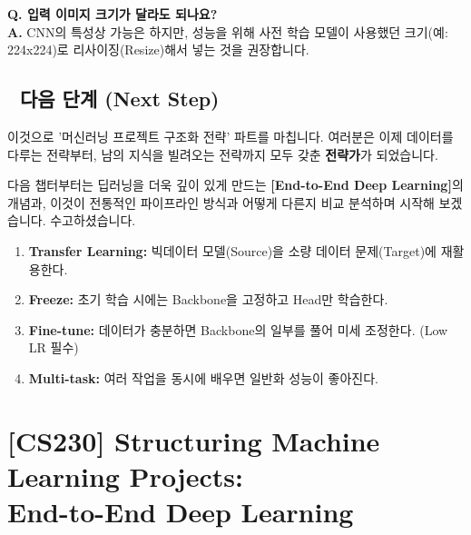 \documentclass[11pt,a4paper]{book}
\theoremstyle{definition}
\begin{document}
\textbf{Q. 입력 이미지 크기가 달라도 되나요?} \\
\textbf{A.} CNN의 특성상 가능은 하지만, 성능을 위해 사전 학습 모델이 사용했던 크기(예: 224x224)로 리사이징(Resize)해서 넣는 것을 권장합니다.

\section*{🔗 다음 단계 (Next Step)}
이것으로 '머신러닝 프로젝트 구조화 전략' 파트를 마칩니다. 여러분은 이제 데이터를 다루는 전략부터, 남의 지식을 빌려오는 전략까지 모두 갖춘 \textbf{전략가}가 되었습니다.

다음 챕터부터는 딥러닝을 더욱 깊이 있게 만드는 \textbf{[End-to-End Deep Learning]}의 개념과, 이것이 전통적인 파이프라인 방식과 어떻게 다른지 비교 분석하며 시작해 보겠습니다. 수고하셨습니다.

\vspace{0.5cm}

\begin{summarybox}[title={단원 요약 (Cheat Sheet)}]
\begin{enumerate}
    \item \textbf{Transfer Learning:} 빅데이터 모델(Source)을 소량 데이터 문제(Target)에 재활용한다.
    \item \textbf{Freeze:} 초기 학습 시에는 Backbone을 고정하고 Head만 학습한다.
    \item \textbf{Fine-tune:} 데이터가 충분하면 Backbone의 일부를 풀어 미세 조정한다. (Low LR 필수)
    \item \textbf{Multi-task:} 여러 작업을 동시에 배우면 일반화 성능이 좋아진다.
\end{enumerate}
\end{summarybox}


\chapter{[CS230] Structuring Machine Learning Projects: \\ End-to-End Deep Learning}
\label{ch:lecture28}

\end{document}
